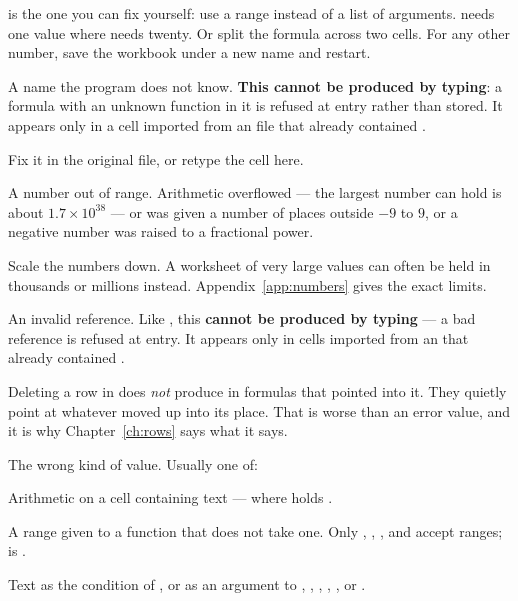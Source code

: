  is the one you can fix yourself: use a range
instead of a list of arguments.  needs one value where
 needs twenty. Or split the formula across two
cells. For any other number, save the workbook under a new name and restart.


 A name the program does not know. \textbf{This cannot be
produced by typing}: a formula with an unknown function in it is refused at
entry rather than stored. It appears only in a cell imported from an
 file that already contained .

 Fix it in the original file, or retype the cell here.


 A number out of range. Arithmetic overflowed --- the largest
number \ccprod{} can hold is about $1.7\times10^{38}$ --- or  was
given a number of places outside $-9$ to $9$, or a negative number was raised
to a fractional power.

 Scale the numbers down. A worksheet of very large values can
often be held in thousands or millions instead. Appendix~\ref{app:numbers} gives the exact
limits.


 An invalid reference. Like , this \textbf{cannot
be produced by typing} --- a bad reference is refused at entry. It appears only
in cells imported from an  that already contained .

\begin{ccnote}
Deleting a row in \ccprod{} does \emph{not} produce  in formulas
that pointed into it. They quietly point at whatever moved up into its place.
That is worse than an error value, and it is why Chapter~\ref{ch:rows} says what it says.
\end{ccnote}


 The wrong kind of value. Usually one of:

\begin{ccsteps}
\item Arithmetic on a cell containing text ---  where 
holds .
\item A range given to a function that does not take one. Only ,
, ,  and  accept ranges;
 is .
\item Text as the condition of , or as an argument to ,
, , , ,  or .
\end{ccsteps}

